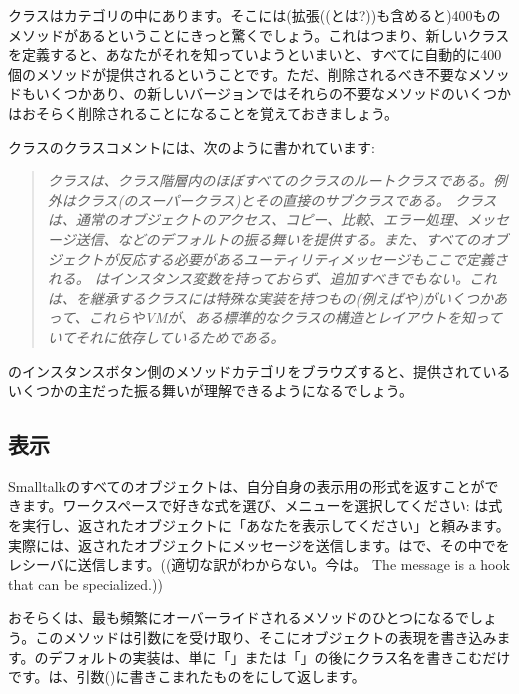 \documentclass[a4paper,10pt,twoside]{book}
\begin{document}
クラスはカテゴリの中にあります。そこには(拡張((とは?))も含めると)400ものメソッドがあるということにきっと驚くでしょう。これはつまり、新しいクラスを定義すると、あなたがそれを知っていようといまいと、すべてに自動的に400個のメソッドが提供されるということです。ただ、削除されるべき不要なメソッドもいくつかあり、\pharo の新しいバージョンではそれらの不要なメソッドのいくつかはおそらく削除されることになることを覚えておきましょう。

クラスのクラスコメントには、次のように書かれています:

\begin{quote}
\textit{クラスは、クラス階層内のほぼすべてのクラスのルートクラスである。例外はクラス(のスーパークラス)とその直接のサブクラスである。
クラスは、通常のオブジェクトのアクセス、コピー、比較、エラー処理、メッセージ送信、などのデフォルトの振る舞いを提供する。また、すべてのオブジェクトが反応する必要があるユーティリティメッセージもここで定義される。
はインスタンス変数を持っておらず、追加すべきでもない。これは、を継承するクラスには特殊な実装を持つもの(例えばや)がいくつかあって、これらやVMが、ある標準的なクラスの構造とレイアウトを知っていてそれに依存しているためである。}
\end{quote}

のインスタンスボタン側のメソッドカテゴリをブラウズすると、提供されているいくつかの主だった振る舞いが理解できるようになるでしょう。

\subsection{表示}
Smalltalkのすべてのオブジェクトは、自分自身の表示用の形式を返すことができます。ワークスペースで好きな式を選び、メニューを選択してください: は式を実行し、返されたオブジェクトに「あなたを表示してください」と頼みます。実際には、返されたオブジェクトにメッセージを送信します。はで、その中でをレシーバに送信します。((適切な訳がわからない。今は。 The message  is a hook that can be specialized.))

おそらくは、最も頻繁にオーバーライドされるメソッドのひとつになるでしょう。このメソッドは引数にを受け取り、そこにオブジェクトの表現を書き込みます。のデフォルトの実装は、単に「」または「」の後にクラス名を書きこむだけです。は、引数()に書きこまれたものをにして返します。
\end{document}
